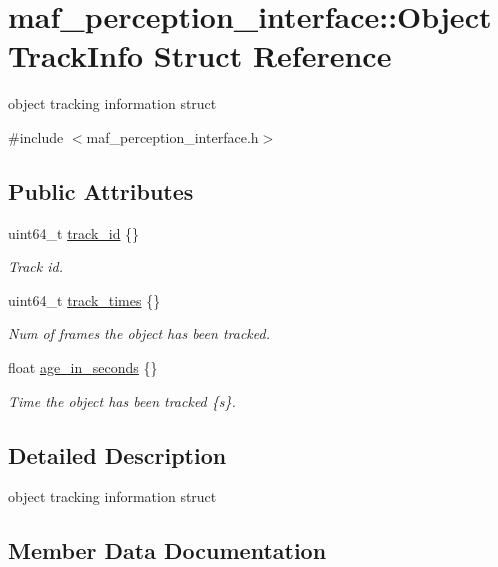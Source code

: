 \hypertarget{structmaf__perception__interface_1_1ObjectTrackInfo}{}\section{maf\+\_\+perception\+\_\+interface\+:\+:Object\+Track\+Info Struct Reference}
\label{structmaf__perception__interface_1_1ObjectTrackInfo}


object tracking information struct  




{\ttfamily \#include $<$maf\+\_\+perception\+\_\+interface.\+h$>$}

\subsection*{Public Attributes}
\begin{DoxyCompactItemize}
\item 
uint64\+\_\+t \hyperlink{structmaf__perception__interface_1_1ObjectTrackInfo_a53205ea8e600866ff8a6b073bb3eb44f}{track\+\_\+id} \{\}
\begin{DoxyCompactList}\small\item\em Track id. \end{DoxyCompactList}\item 
uint64\+\_\+t \hyperlink{structmaf__perception__interface_1_1ObjectTrackInfo_aff9114460c8ad0d036352fca9e59d9bf}{track\+\_\+times} \{\}
\begin{DoxyCompactList}\small\item\em Num of frames the object has been tracked. \end{DoxyCompactList}\item 
float \hyperlink{structmaf__perception__interface_1_1ObjectTrackInfo_a24335121773c7ece26ce8a325abcdf11}{age\+\_\+in\+\_\+seconds} \{\}
\begin{DoxyCompactList}\small\item\em Time the object has been tracked \{s\}. \end{DoxyCompactList}\end{DoxyCompactItemize}


\subsection{Detailed Description}
object tracking information struct 

\subsection{Member Data Documentation}
\mbox{\label{structmaf__perception__interface_1_1ObjectTrackInfo_a24335121773c7ece26ce8a325abcdf11}} 
